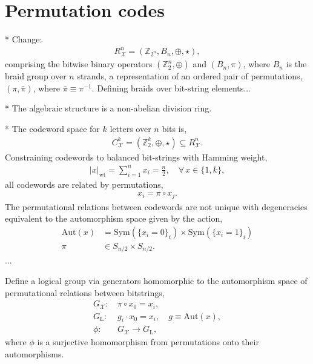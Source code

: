 \documentclass[twocolumn, aps, amsmath, amssymb, nofootinbib, superscriptaddress, longbibliography, doublefloatfix, table-of-contents, eqsecnum, rmp]{revtex4-2}
\begin{document}

\section{Permutation codes}

* Change:
\begin{align}
	R_\mathcal{X}^n = (\mathbb{Z}_{2^n}, B_n, \oplus, \star),
\end{align}
comprising the bitwise binary operators $(\mathbb{Z}_2^n,\oplus)$ and $(B_n,\pi)$, where $B_n$ is the braid group over $n$ strands, a representation of an ordered pair of permutations, $(\pi,\bar{\pi})$, where $\bar{\pi}\equiv \pi^{-1}$. Defining braids over bit-string elements...

* The algebraic structure is a non-abelian division ring.

* The codeword space for $k$ letters over $n$ bits is,
\begin{align}
	C_\mathcal{X}^k = (\mathbb{Z}_2^k,\oplus,\star) \subseteq R_\mathcal{X}^n.
\end{align}
Constraining codewords to balanced bit-strings with Hamming weight,
\begin{align}
	|x|_\mathrm{wt} = \sum_{i=1}^n x_i = \frac{n}{2},\quad\forall\, x\in\{1,k\},
\end{align}
all codewords are related by permutations,
\begin{align}
	x_i = \pi \circ x_j.
\end{align}
The permutational relations between codewords are not unique with degeneracies equivalent to the automorphism space given by the action,
\begin{align}
	\mathrm{Aut}(x) &= \mathrm{Sym}(\{x_i=0\}_i) \times \mathrm{Sym}(\{x_i=1\}_i)\nonumber\\
	\pi &\in S_{n/2} \times S_{n/2}.
\end{align}
...

Define a logical group via generators homomorphic to the automorphism space of permutational relations between bitstrings,
\begin{align}
	G_\mathcal{X}:\, &\pi\circ x_0 = x_i, \nonumber\\
	G_\mathrm{L}:\, &g_i \cdot x_0 = x_i,\quad g\equiv \mathrm{Aut}(x),\nonumber\\
	\phi:\, & G_\mathcal{X} \to G_\mathrm{L},
\end{align}
where $\phi$ is a surjective homomorphism from permutations onto their automorphisms.
\end{document}
